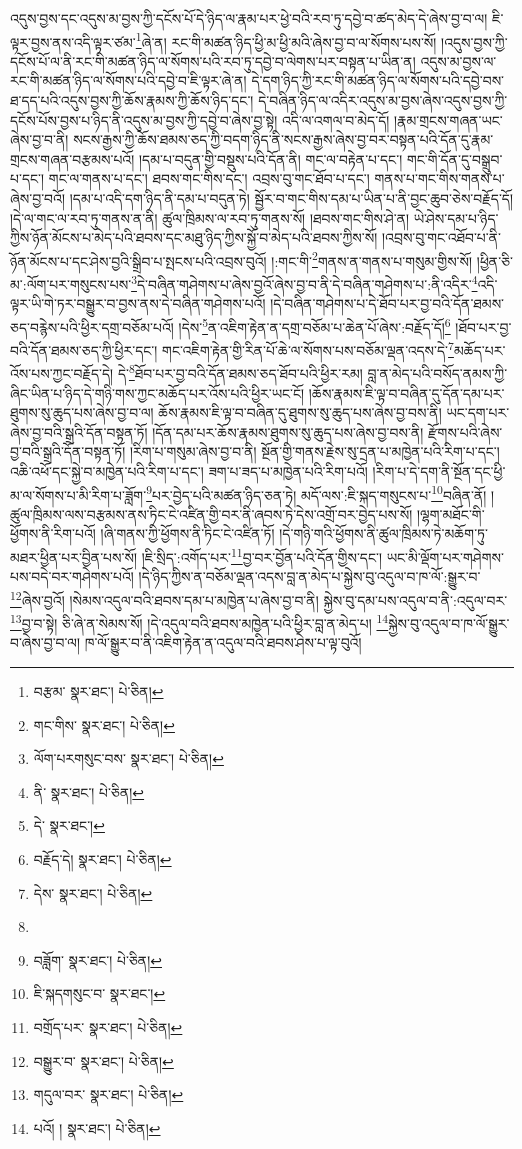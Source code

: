 འདུས་བྱས་དང་འདུས་མ་བྱས་ཀྱི་དངོས་པོ་དེ་ཉིད་ལ་རྣམ་པར་ཕྱེ་བའི་རབ་ཏུ་དབྱེ་བ་ཚད་མེད་དེ་ཞེས་བྱ་བ་ལ། ཇི་ལྟར་བྱས་ནས་འདི་ལྟར་ཙམ་\footnote{བརྩམ་  སྣར་ཐང་།  པེ་ཅིན། }ཞེ་ན། རང་གི་མཚན་ཉིད་ཕྱི་མ་ཕྱི་མའི་ཞེས་བྱ་བ་ལ་སོགས་པས་སོ། །འདུས་བྱས་ཀྱི་དངོས་པོ་ལ་ནི་རང་གི་མཚན་ཉིད་ལ་སོགས་པའི་རབ་ཏུ་དབྱེ་བ་ལེགས་པར་བསྟན་པ་ཡིན་ན། འདུས་མ་བྱས་ལ་རང་གི་མཚན་ཉིད་ལ་སོགས་པའི་དབྱེ་བ་ཇི་ལྟར་ཞེ་ན། དེ་དག་ཉིད་ཀྱི་རང་གི་མཚན་ཉིད་ལ་སོགས་པའི་དབྱེ་བས་ཐ་དད་པའི་འདུས་བྱས་ཀྱི་ཆོས་རྣམས་ཀྱི་ཆོས་ཉིད་དང་། དེ་བཞིན་ཉིད་ལ་འདིར་འདུས་མ་བྱས་ཞེས་འདུས་བྱས་ཀྱི་དངོས་པོས་བྱས་པ་ཉིད་ནི་འདུས་མ་བྱས་ཀྱི་དབྱེ་བ་ཞེས་བྱ་སྟེ། འདི་ལ་འགལ་བ་མེད་དོ། །རྣམ་གྲངས་གཞན་ཡང་ཞེས་བྱ་བ་ནི། སངས་རྒྱས་ཀྱི་ཆོས་ཐམས་ཅད་ཀྱི་བདག་ཉིད་ནི་སངས་རྒྱས་ཞེས་བྱ་བར་བསྟན་པའི་དོན་དུ་རྣམ་གྲངས་གཞན་བརྩམས་པའོ། །དམ་པ་བདུན་གྱི་བསྡུས་པའི་དོན་ནི། གང་ལ་བརྟེན་པ་དང་། གང་གི་དོན་དུ་བསྒྲུབ་པ་དང་། གང་ལ་གནས་པ་དང་། ཐབས་གང་གིས་དང་། འབྲས་བུ་གང་ཐོབ་པ་དང་། གནས་པ་གང་གིས་གནས་པ་ཞེས་བྱ་བའོ། །དམ་པ་འདི་དག་ཉིད་ནི་དམ་པ་བདུན་ཏེ། སྦྱོར་བ་གང་གིས་དམ་པ་ཡིན་པ་ནི་བྱང་ཆུབ་ཅེས་བརྗོད་དོ། །དེ་ལ་གང་ལ་རབ་ཏུ་གནས་ན་ནི། ཚུལ་ཁྲིམས་ལ་རབ་ཏུ་གནས་སོ། །ཐབས་གང་གིས་ཤེ་ན། ཡེ་ཤེས་དམ་པ་ཉིད་ཀྱིས་ཉོན་མོངས་པ་མེད་པའི་ཐབས་དང་མཐུ་ཉིད་ཀྱིས་སྐྱོ་བ་མེད་པའི་ཐབས་ཀྱིས་སོ། །འབྲས་བུ་གང་འཐོབ་པ་ནི་ཉོན་མོངས་པ་དང་ཤེས་བྱའི་སྒྲིབ་པ་སྤངས་པའི་འབྲས་བུའོ། །:གང་གི་\footnote{གང་གིས་  སྣར་ཐང་།  པེ་ཅིན། }གནས་ན་གནས་པ་གསུམ་གྱིས་སོ། །ཕྱིན་ཅི་མ་:ལོག་པར་གསུངས་པས་\footnote{ལོག་པརགསུང་བས་  སྣར་ཐང་།  པེ་ཅིན། }དེ་བཞིན་གཤེགས་པ་ཞེས་བྱའོ་ཞེས་བྱ་བ་ནི་དེ་བཞིན་གཤེགས་པ་:ནི་འདིར་\footnote{ནི་  སྣར་ཐང་།  པེ་ཅིན། }འདི་ལྟར་ཡི་གེ་ཏར་བསྒྱུར་བ་བྱས་ནས་དེ་བཞིན་གཤེགས་པའོ། །དེ་བཞིན་གཤེགས་པ་དེ་ཐོབ་པར་བྱ་བའི་དོན་ཐམས་ཅད་བརྙེས་པའི་ཕྱིར་དགྲ་བཅོམ་པའོ། །དེས་\footnote{དེ་  སྣར་ཐང་། }ན་འཇིག་རྟེན་ན་དགྲ་བཅོམ་པ་ཆེན་པོ་ཞེས་:བརྗོད་དོ།\footnote{བརྗོད་དེ།  སྣར་ཐང་།  པེ་ཅིན། } །ཐོབ་པར་བྱ་བའི་དོན་ཐམས་ཅད་ཀྱི་ཕྱིར་དང་། གང་འཇིག་རྟེན་གྱི་རིན་པོ་ཆེ་ལ་སོགས་པས་བཅོམ་ལྡན་འདས་དེ་\footnote{དེས་  སྣར་ཐང་།  པེ་ཅིན། }མཆོད་པར་འོས་པས་ཀྱང་བརྗོད་དེ། དེ་\footnote{}ཐོབ་པར་བྱ་བའི་དོན་ཐམས་ཅད་ཐོབ་པའི་ཕྱིར་རམ། བླ་ན་མེད་པའི་བསོད་ནམས་ཀྱི་ཞིང་ཡིན་པ་ཉིད་དེ་གཉི་གས་ཀྱང་མཆོད་པར་འོས་པའི་ཕྱིར་ཡང་ངོ། །ཆོས་རྣམས་ཇི་ལྟ་བ་བཞིན་དུ་དོན་དམ་པར་ཐུགས་སུ་ཆུད་པས་ཞེས་བྱ་བ་ལ། ཆོས་རྣམས་ཇི་ལྟ་བ་བཞིན་དུ་ཐུགས་སུ་ཆུད་པས་ཞེས་བྱ་བས་ནི། ཡང་དག་པར་ཞེས་བྱ་བའི་སྒྲའི་དོན་བསྟན་ཏོ། །དོན་དམ་པར་ཆོས་རྣམས་ཐུགས་སུ་ཆུད་པས་ཞེས་བྱ་བས་ནི། རྫོགས་པའི་ཞེས་བྱ་བའི་སྒྲའི་དོན་བསྟན་ཏོ། །རིག་པ་གསུམ་ཞེས་བྱ་བ་ནི། སྔོན་གྱི་གནས་རྗེས་སུ་དྲན་པ་མཁྱེན་པའི་རིག་པ་དང་། འཆི་འཕོ་དང་སྐྱེ་བ་མཁྱེན་པའི་རིག་པ་དང་། ཟག་པ་ཟད་པ་མཁྱེན་པའི་རིག་པའོ། །རིག་པ་དེ་དག་ནི་སྔོན་དང་ཕྱི་མ་ལ་སོགས་པ་མི་རིག་པ་ཟློག་\footnote{བཟློག་  སྣར་ཐང་།  པེ་ཅིན། }པར་བྱེད་པའི་མཚན་ཉིད་ཅན་ཏེ། མདོ་ལས་:ཇི་སྐད་གསུངས་པ་\footnote{ཇི་སྐདགསུང་བ་  སྣར་ཐང་། }བཞིན་ནོ། །ཚུལ་ཁྲིམས་ལས་བརྩམས་ནས་ཏིང་ངེ་འཛིན་གྱི་བར་ནི་ཞབས་ཏེ་དེས་འགྲོ་བར་བྱེད་པས་སོ། །ལྷག་མཐོང་གི་ཕྱོགས་ནི་རིག་པའོ། །ཞི་གནས་ཀྱི་ཕྱོགས་ནི་ཏིང་ངེ་འཛིན་ཏོ། །དེ་གཉི་གའི་ཕྱོགས་ནི་ཚུལ་ཁྲིམས་ཏེ་མཆོག་ཏུ་མཐར་ཕྱིན་པར་བྱིན་པས་སོ། །ཇི་སྲིད་:འགོད་པར་\footnote{བགྲོད་པར་  སྣར་ཐང་།  པེ་ཅིན། }བྱ་བར་བྱོན་པའི་དོན་གྱིས་དང་། ཡང་མི་ལྡོག་པར་གཤེགས་པས་བདེ་བར་གཤེགས་པའོ། །དེ་ཉིད་ཀྱིས་ན་བཅོམ་ལྡན་འདས་བླ་ན་མེད་པ་སྐྱེས་བུ་འདུལ་བ་ཁ་ལོ་:སྒྱུར་བ་\footnote{བསྒྱུར་བ་  སྣར་ཐང་།  པེ་ཅིན། }ཞེས་བྱའོ། །སེམས་འདུལ་བའི་ཐབས་དམ་པ་མཁྱེན་པ་ཞེས་བྱ་བ་ནི། སྐྱེས་བུ་དམ་པས་འདུལ་བ་ནི་:འདུལ་བར་\footnote{གདུལ་བར་  སྣར་ཐང་།  པེ་ཅིན། }བྱ་བ་སྟེ། ཅི་ཞེ་ན་སེམས་སོ། །དེ་འདུལ་བའི་ཐབས་མཁྱེན་པའི་ཕྱིར་བླ་ན་མེད་པ། \footnote{པའོ། །   སྣར་ཐང་།  པེ་ཅིན། }སྐྱེས་བུ་འདུལ་བ་ཁ་ལོ་སྒྱུར་བ་ཞེས་བྱ་བ་ལ། ཁ་ལོ་སྒྱུར་བ་ནི་འཇིག་རྟེན་ན་འདུལ་བའི་ཐབས་ཤེས་པ་ལྟ་བུའོ། 